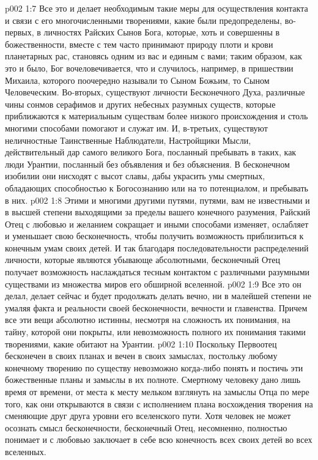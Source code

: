 \vs p002 1:7 Все это и делает необходимым такие меры для осуществления контакта и связи с его многочисленными творениями, какие были предопределены, во\hyp{}первых, в личностях Райских Сынов Бога, которые, хоть и совершенны в божественности, вместе с тем часто принимают природу плоти и крови планетарных рас, становясь одним из вас и единым с вами; таким образом, как это и было, Бог вочеловечивается, что и случилось, например, в пришествии Михаила, которого поочередно называли то Сыном Божьим, то Сыном Человеческим. Во\hyp{}вторых, существуют личности Бесконечного Духа, различные чины сонмов серафимов и других небесных разумных существ, которые приближаются к материальным существам более низкого происхождения и столь многими способами помогают и служат им. И, в\hyp{}третьих, существуют неличностные Таинственные Наблюдатели, Настройщики Мысли, действительный дар самого великого Бога, посланный пребывать в таких, как люди Урантии, посланный без объявления и без объяснения. В бесконечном изобилии они нисходят с высот славы, дабы украсить умы смертных, обладающих способностью к Богосознанию или на то потенциалом, и пребывать в них.
\vs p002 1:8 Этими и многими другими путями, путями, вам не известными и в высшей степени выходящими за пределы вашего конечного разумения, Райский Отец с любовью и желанием сокращает и иными способами изменяет, ослабляет и уменьшает свою бесконечность, чтобы получить возможность приблизиться к конечным умам своих детей. И так благодаря последовательности распределений личности, которые являются убывающе абсолютными, бесконечный Отец получает возможность наслаждаться тесным контактом с различными разумными существами из множества миров его обширной вселенной.
\vs p002 1:9 Все это он делал, делает сейчас и будет продолжать делать вечно, ни в малейшей степени не умаляя факта и реальности своей бесконечности, вечности и главенства. Причем все эти вещи абсолютно истинны, несмотря на сложность их понимания, на тайну, которой они покрыты, или невозможность полного их понимания такими творениями, какие обитают на Урантии.
\vs p002 1:10 \pc Поскольку Первоотец бесконечен в своих планах и вечен в своих замыслах, постольку любому конечному творению по существу невозможно когда\hyp{}либо понять и постичь эти божественные планы и замыслы в их полноте. Смертному человеку дано лишь время от времени, от места к месту мельком взглянуть на замыслы Отца по мере того, как они открываются в связи с исполнением плана восхождения творения на сменяющие друг друга уровни его вселенского пути. Хотя человек не может осознать смысл бесконечности, бесконечный Отец, несомненно, полностью понимает и с любовью заключает в себе всю конечность всех своих детей во всех вселенных.
